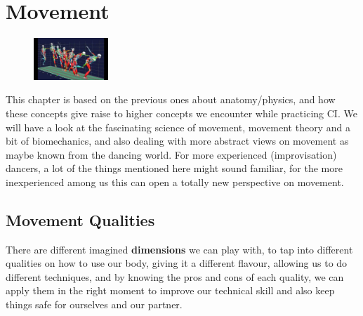 \section{Movement}\label{sec:movement}

\begin{figure}
    \centering
    \includegraphics[width=0.25\textwidth]{images/movement}
\end{figure}

This chapter is based on the previous ones about anatomy/physics, and how these concepts give raise to higher concepts we encounter while practicing CI\@.
We will have a look at the fascinating science of movement, movement theory and a bit of biomechanics, and also dealing with more abstract views on movement as maybe known from the dancing world.
For more experienced (improvisation) dancers, a lot of the things mentioned here might sound familiar, for the more inexperienced among us this can open a totally new perspective on movement.

\subsection{Movement Qualities}\label{subsec:movement-qualities}

There are different imagined \textbf{dimensions} we can play with, to tap into different qualities on how to use our body, giving it a different flavour, allowing us to do different techniques, and by knowing the pros and cons of each quality, we can apply them in the right moment to improve our technical skill and also keep things safe for ourselves and our partner.


